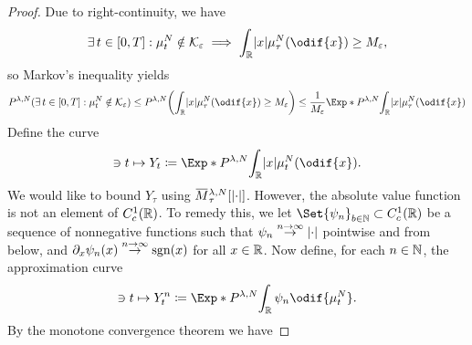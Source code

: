 \begin{proof}
  Due to right-continuity, we have
  \begin{equation}
    \exists t \in [0,T] : \mu_t^N \notin \cK_\eps \implies \int_\potspace \abs{x} \mu_\tau^N(\odif{x}) \geq M_\eps,
  \end{equation}
  so Markov's inequality yields
  \begin{equation}
    P^{\lambda, N} (\exists t \in [0,T] : \mu_t^N \notin \cK_\eps)
    \leq P^{\lambda, N} \br*{ \int_\potspace \abs{x} \mu_\tau^N(\odif{x}) \geq M_\eps }
    \leq \frac{1}{M_\eps} \Exp*{P^{\lambda, N}}{\int_\potspace \abs{x} \mu_\tau^N(\odif{x})}
  \end{equation}
  Define the curve
  \begin{equation}
    [0,T] \ni t \mapsto Y_t \coloneqq \Exp*{P^{\lambda, N}}{\int_\potspace \abs{x} \mu_t^N(\odif{x})}.
  \end{equation}
  We would like to bound \( Y_\tau \) using \( \ol{M}_\tau^{\lambda, N}[\abs{\cdot}] \).
  However, the absolute value function is not an element of \( C_c^1(\mathbb{R}) \).
  To remedy this, we let \( \Set{\psi_n}_{b\in\bN} \subset C_c^1(\potspace)\) be a sequence of nonnegative functions such that \( \psi_n \overset{n\to\infty}{\to} \lvert\cdot\rvert \) pointwise and from below, and \( \partial_x \psi_n(x) \overset{n\to\infty}{\to} \operatorname{sgn}(x) \) for all \( x \in \mathbb{R} \).
  Now define, for each \( n \in \mathbb{N} \), the approximation curve
  \begin{equation}
    [0,T] \ni t \mapsto Y_t^n \coloneqq \Exp*{P^{\lambda, N}}{\int_\potspace \psi_n \odif{\mu_t^N}}.
  \end{equation}
  By the monotone convergence theorem we have

\end{proof}
